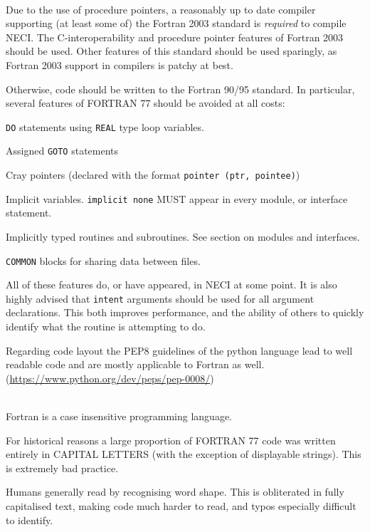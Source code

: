 \documentclass[a4paper,notitlepage]{scrreprt}
\newenvironment{packed_itemize}{
	\begin{itemize}
		\setlength{\itemsep}{1pt}
		\setlength{\parskip}{0pt}
		\setlength{\parsep}{0pt}
	}{\end{itemize}}
\newcommand\headitem[1]{\needspace{1.5\baselineskip}\item[{\boldmath #1 \nopagebreak}] \hfill \\ \nopagebreak}
\let\code\lstinline
\begin{document}
\begin{description}

	\headitem{Fortran standard}
		Due to the use of procedure pointers, a reasonably up to date compiler
		supporting (at least some of) the Fortran 2003 standard is
		\emph{required} to compile NECI. The C-interoperability and procedure
		pointer features of Fortran 2003 should be used. Other features of this
		standard should be used sparingly, as Fortran 2003 support in compilers
		is patchy at best.

		Otherwise, code should be written to the Fortran 90/95 standard. In
		particular, several features of FORTRAN 77 should be avoided at all
		costs:
		\begin{packed_itemize}
			\item
				\code{DO} statements using \code{REAL} type loop
				variables.
			\item Assigned \code{GOTO} statements
			\item
				Cray pointers (declared with the format
				\code{pointer (ptr, pointee)})
			\item
				Implicit variables. \code{implicit none} MUST appear in
				every module, or interface statement.
			\item
				Implicitly typed routines and subroutines. See section on
				modules and interfaces.
			\item
				\code{COMMON} blocks for sharing data between files.
		\end{packed_itemize}
		All of these features do, or have appeared, in NECI at some point.
        It is also highly advised that \code{intent} arguments
        should be used for all argument declarations.
        This both improves performance, and the ability of
        others to quickly identify what the routine is attempting to do.

        Regarding code layout the PEP8 guidelines of the python language
        lead to well readable code and are mostly applicable to Fortran
        as well. (\url{https://www.python.org/dev/peps/pep-0008/})

	\headitem{CAPITAL letters}
		Fortran is a case insensitive programming language.

		For historical reasons a large proportion of FORTRAN 77 code was
		written entirely in CAPITAL LETTERS (with the exception of displayable
		strings). This is extremely bad practice.

		Humans generally read by recognising word shape. This is obliterated
		in fully capitalised text, making code much harder to read, and typos
		especially difficult to identify.


\end{description}
\end{document}
